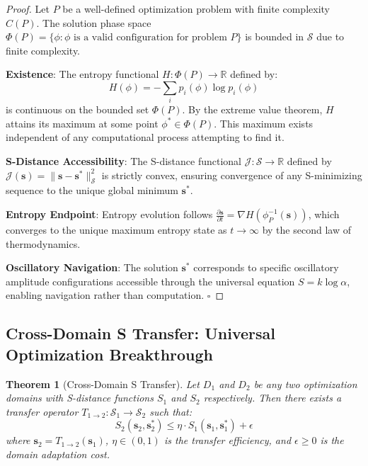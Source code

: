 \documentclass[12pt,a4paper]{article}
\newtheorem{theorem}{Theorem}
\begin{document}
\begin{proof}
Let $P$ be a well-defined optimization problem with finite complexity $C(P)$. The solution phase space $\Phi(P) = \{\phi : \phi \text{ is a valid configuration for problem } P\}$ is bounded in $\mathcal{S}$ due to finite complexity.

\textbf{Existence}: The entropy functional $H: \Phi(P) \to \mathbb{R}$ defined by:
\begin{equation}
H(\phi) = -\sum_{i} p_i(\phi) \log p_i(\phi)
\end{equation}
is continuous on the bounded set $\Phi(P)$. By the extreme value theorem, $H$ attains its maximum at some point $\phi^* \in \Phi(P)$. This maximum exists independent of any computational process attempting to find it.

\textbf{S-Distance Accessibility}: The S-distance functional $\mathcal{J}: \mathcal{S} \to \mathbb{R}$ defined by $\mathcal{J}(\mathbf{s}) = \|\mathbf{s} - \mathbf{s}^*\|_{\mathcal{S}}^2$ is strictly convex, ensuring convergence of any S-minimizing sequence to the unique global minimum $\mathbf{s}^*$.

\textbf{Entropy Endpoint}: Entropy evolution follows $\frac{\partial \mathbf{s}}{\partial t} = \nabla H(\phi_{P}^{-1}(\mathbf{s}))$, which converges to the unique maximum entropy state as $t \to \infty$ by the second law of thermodynamics.

\textbf{Oscillatory Navigation}: The solution $\mathbf{s}^*$ corresponds to specific oscillatory amplitude configurations accessible through the universal equation $S = k \log \alpha$, enabling navigation rather than computation. $\square$
\end{proof}

\subsection{Cross-Domain S Transfer: Universal Optimization Breakthrough}

\begin{theorem}[Cross-Domain S Transfer]
Let $D_1$ and $D_2$ be any two optimization domains with S-distance functions $S_1$ and $S_2$ respectively. Then there exists a transfer operator $T_{1 \to 2}: \mathcal{S}_1 \to \mathcal{S}_2$ such that:
\begin{equation}
S_2(\mathbf{s}_2, \mathbf{s}_2^*) \leq \eta \cdot S_1(\mathbf{s}_1, \mathbf{s}_1^*) + \epsilon
\end{equation}
where $\mathbf{s}_2 = T_{1 \to 2}(\mathbf{s}_1)$, $\eta \in (0, 1)$ is the transfer efficiency, and $\epsilon \geq 0$ is the domain adaptation cost.
\end{theorem}
\end{document}
